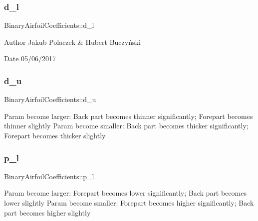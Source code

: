 \subsubsection{\texorpdfstring{d\+\_\+l}{d\_l}}
{\footnotesize\ttfamily Binary\+Airfoil\+Coefficients\+::d\+\_\+l}

\begin{DoxyAuthor}{Author}
Jakub Polaczek \& Hubert Buczyński 
\end{DoxyAuthor}
\begin{DoxyDate}{Date}
05/06/2017 
\end{DoxyDate}
\mbox{\label{struct_binary_airfoil_coefficients_a9640283446988bbdb012e94aaf2a41a3}} 
\subsubsection{\texorpdfstring{d\+\_\+u}{d\_u}}
{\footnotesize\ttfamily Binary\+Airfoil\+Coefficients\+::d\+\_\+u}

Param become larger\+: Back part becomes thinner significantly; Forepart becomes thinner slightly Param become smaller\+: Back part becomes thicker significantly; Forepart becomes thicker slightly \mbox{\label{struct_binary_airfoil_coefficients_a9474385e776695d50b75914ff62bd37a}} 
\subsubsection{\texorpdfstring{p\+\_\+l}{p\_l}}
{\footnotesize\ttfamily Binary\+Airfoil\+Coefficients\+::p\+\_\+l}

Param become larger\+: Forepart becomes lower significantly; Back part becomes lower slightly Param become smaller\+: Forepart becomes higher significantly; Back part becomes higher slightly \mbox{\label{struct_binary_airfoil_coefficients_adc5da813d292a991f0e038348ff26ae1}} 
